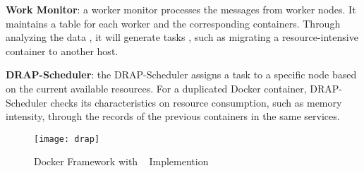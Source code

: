 {\bf Work Monitor}: a worker monitor processes the messages from worker nodes. It maintains a table for each worker and the corresponding containers. 
Through analyzing the data \added{[how]}, it will generate tasks , such as migrating a resource-intensive container to another host.

{\bf DRAP-Scheduler}: the DRAP-Scheduler assigns a task to a specific node based on the current available resources. For a duplicated  Docker container,
DRAP-Scheduler checks its characteristics on resource consumption, 
such as memory intensity, through the records of the previous containers in the same services.



\begin{figure}[ht]
\centering
\texttt{[image: drap]}
\caption{Docker Framework with \sol~ Implemention}
\label{fig:drap} 
\end{figure}